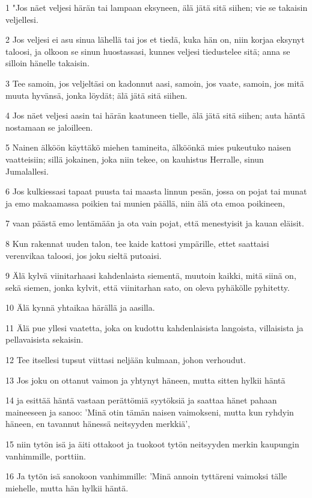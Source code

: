 \par 1 "Jos näet veljesi härän tai lampaan eksyneen, älä jätä sitä siihen; vie se takaisin veljellesi.
\par 2 Jos veljesi ei asu sinua lähellä tai jos et tiedä, kuka hän on, niin korjaa eksynyt taloosi, ja olkoon se sinun huostassasi, kunnes veljesi tiedustelee sitä; anna se silloin hänelle takaisin.
\par 3 Tee samoin, jos veljeltäsi on kadonnut aasi, samoin, jos vaate, samoin, jos mitä muuta hyvänsä, jonka löydät; älä jätä sitä siihen.
\par 4 Jos näet veljesi aasin tai härän kaatuneen tielle, älä jätä sitä siihen; auta häntä nostamaan se jaloilleen.
\par 5 Nainen älköön käyttäkö miehen tamineita, älköönkä mies pukeutuko naisen vaatteisiin; sillä jokainen, joka niin tekee, on kauhistus Herralle, sinun Jumalallesi.
\par 6 Jos kulkiessasi tapaat puusta tai maasta linnun pesän, jossa on pojat tai munat ja emo makaamassa poikien tai munien päällä, niin älä ota emoa poikineen,
\par 7 vaan päästä emo lentämään ja ota vain pojat, että menestyisit ja kauan eläisit.
\par 8 Kun rakennat uuden talon, tee kaide kattosi ympärille, ettet saattaisi verenvikaa taloosi, jos joku sieltä putoaisi.
\par 9 Älä kylvä viinitarhaasi kahdenlaista siementä, muutoin kaikki, mitä siinä on, sekä siemen, jonka kylvit, että viinitarhan sato, on oleva pyhäkölle pyhitetty.
\par 10 Älä kynnä yhtaikaa härällä ja aasilla.
\par 11 Älä pue yllesi vaatetta, joka on kudottu kahdenlaisista langoista, villaisista ja pellavaisista sekaisin.
\par 12 Tee itsellesi tupsut viittasi neljään kulmaan, johon verhoudut.
\par 13 Jos joku on ottanut vaimon ja yhtynyt häneen, mutta sitten hylkii häntä
\par 14 ja esittää häntä vastaan perättömiä syytöksiä ja saattaa hänet pahaan maineeseen ja sanoo: 'Minä otin tämän naisen vaimokseni, mutta kun ryhdyin häneen, en tavannut hänessä neitsyyden merkkiä',
\par 15 niin tytön isä ja äiti ottakoot ja tuokoot tytön neitsyyden merkin kaupungin vanhimmille, porttiin.
\par 16 Ja tytön isä sanokoon vanhimmille: 'Minä annoin tyttäreni vaimoksi tälle miehelle, mutta hän hylkii häntä.
